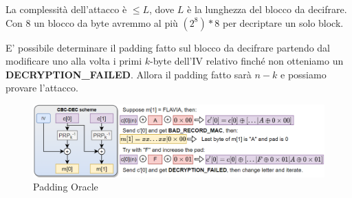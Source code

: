 \begin{example}
\begin{remark}
La complessità dell'attacco è $\leq{L}$, dove $L$ è la lunghezza del blocco da decifrare. Con 8 un blocco da byte avremmo al più $(2^8)*8$ per decriptare un solo block.
\end{remark}
\begin{remark}
E' possibile determinare il padding fatto sul blocco da decifrare partendo dal modificare uno alla volta i primi $k$-byte dell'IV relativo finché non otteniamo un \textbf{DECRYPTION\_FAILED}. Allora il padding fatto sarà $n-k$ e possiamo provare l'attacco.
\end{remark}
\end{example}
\begin{figure}[ht]
    \centering
    \includegraphics[width=\linewidth]{image/padoracle.png}
    \caption{Padding Oracle}
    \label{fig:padoracle}
\end{figure}
